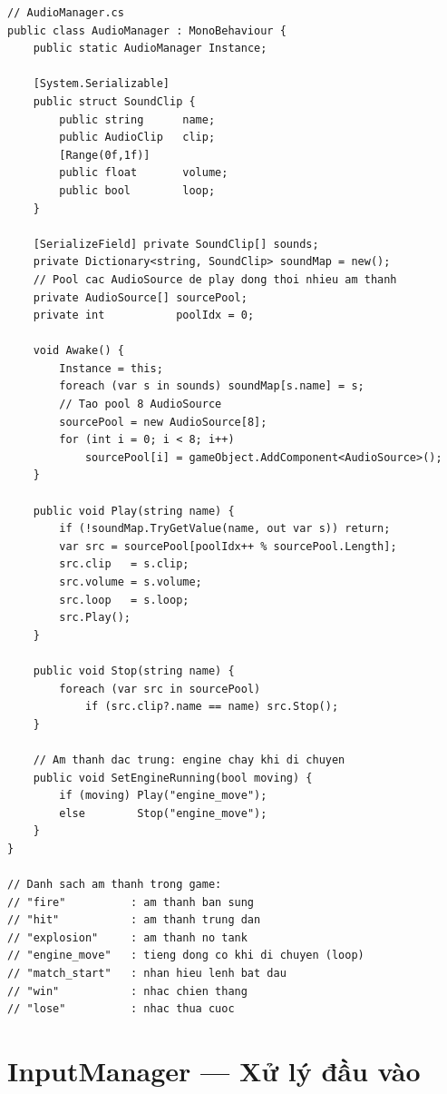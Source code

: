 \documentclass[12pt,a4paper]{report}
\begin{document}
\begin{lstlisting}[style=bashStyle, caption={AudioManager --- quản lý và phát âm thanh game}, label={lst:audiomgr}]
// AudioManager.cs
public class AudioManager : MonoBehaviour {
    public static AudioManager Instance;

    [System.Serializable]
    public struct SoundClip {
        public string      name;
        public AudioClip   clip;
        [Range(0f,1f)]
        public float       volume;
        public bool        loop;
    }

    [SerializeField] private SoundClip[] sounds;
    private Dictionary<string, SoundClip> soundMap = new();
    // Pool cac AudioSource de play dong thoi nhieu am thanh
    private AudioSource[] sourcePool;
    private int           poolIdx = 0;

    void Awake() {
        Instance = this;
        foreach (var s in sounds) soundMap[s.name] = s;
        // Tao pool 8 AudioSource
        sourcePool = new AudioSource[8];
        for (int i = 0; i < 8; i++)
            sourcePool[i] = gameObject.AddComponent<AudioSource>();
    }

    public void Play(string name) {
        if (!soundMap.TryGetValue(name, out var s)) return;
        var src = sourcePool[poolIdx++ % sourcePool.Length];
        src.clip   = s.clip;
        src.volume = s.volume;
        src.loop   = s.loop;
        src.Play();
    }

    public void Stop(string name) {
        foreach (var src in sourcePool)
            if (src.clip?.name == name) src.Stop();
    }

    // Am thanh dac trung: engine chay khi di chuyen
    public void SetEngineRunning(bool moving) {
        if (moving) Play("engine_move");
        else        Stop("engine_move");
    }
}

// Danh sach am thanh trong game:
// "fire"          : am thanh ban sung
// "hit"           : am thanh trung dan
// "explosion"     : am thanh no tank
// "engine_move"   : tieng dong co khi di chuyen (loop)
// "match_start"   : nhan hieu lenh bat dau
// "win"           : nhac chien thang
// "lose"          : nhac thua cuoc
\end{lstlisting}

\section{InputManager --- Xử lý đầu vào}
\end{document}
